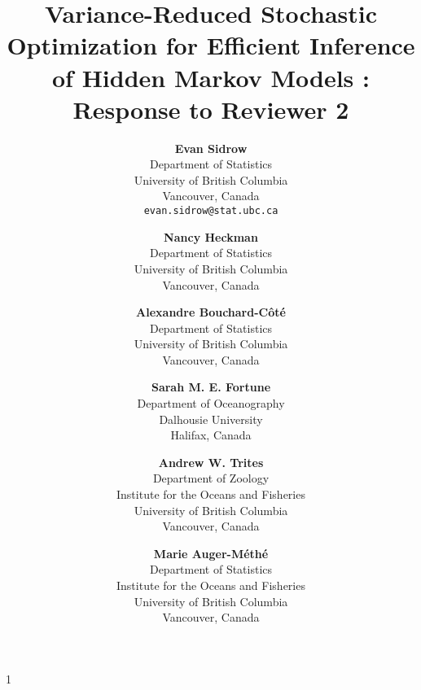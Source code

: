 \documentclass[11pt]{article}
\date{}
\newcommand{\blind}{1}
\begin{document}
%

\def\spacingset#1{\renewcommand{\baselinestretch}%
{#1}\small\normalsize} \spacingset{1}


\blind
{
    \title{Variance-Reduced Stochastic Optimization for Efficient Inference of Hidden Markov Models : Response to Reviewer 2}

    \author{
      \textbf{Evan Sidrow} \\
      Department of Statistics \\
      University of British Columbia\\
      Vancouver, Canada \\
      \texttt{evan.sidrow@stat.ubc.ca} \\
      \and
      \textbf{Nancy Heckman} \\
      Department of Statistics \\
      University of British Columbia \\
      Vancouver, Canada \\
      \and
      \textbf{Alexandre Bouchard-C\^ot\'e} \\
      Department of Statistics \\
      University of British Columbia \\
      Vancouver, Canada \\
      \and
      \textbf{Sarah M. E. Fortune} \\
      Department of Oceanography \\
      Dalhousie University \\
      Halifax, Canada \\
      \and
      \textbf{Andrew W. Trites} \\
      Department of Zoology \\
      Institute for the Oceans and Fisheries \\
      University of British Columbia \\
      Vancouver, Canada \\
      \and
      \textbf{Marie Auger-M\'eth\'e} \\
      Department of Statistics \\
      Institute for the Oceans and Fisheries \\
      University of British Columbia \\
      Vancouver, Canada \\
    }
    \maketitle
} \fi
\end{document}
